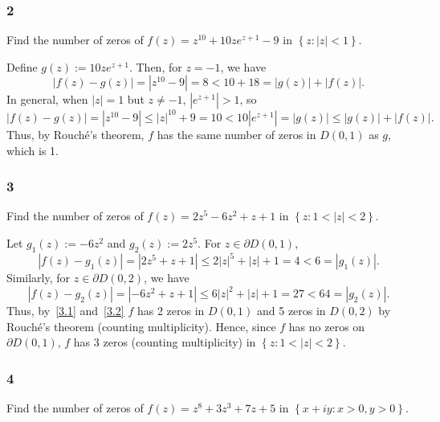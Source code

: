 \documentclass[12pt]{article}
\begin{document}
\newpage
\subsubsection*{2}
\begin{tcolorbox}
  Find the number of zeros of $f(z) = z^{10} + 10ze^{z + 1} - 9$ in $\left\{ z : |z| < 1 \right\}$.
\end{tcolorbox}
Define $g(z) := 10ze^{z+1}$. Then, for $z = -1$, we have
\[ |f(z) - g(z)| = |z^{10} - 9| = 8 < 10 + 18 = |g(z)| + |f(z)|. \]
In general, when $|z| = 1$ but $z \neq -1$, $|e^{z + 1}| > 1$, so
\[ |f(z) - g(z)| = |z^{10} - 9| \leq |z|^{10} + 9 = 10 < 10|e^{z+1}| = |g(z)| \leq |g(z)| + |f(z)|. \]
Thus, by Rouch\'{e}'s theorem, $f$ has the same number of zeros in $D(0,1)$ as $g$, which is 1.

\subsubsection*{3}
\begin{tcolorbox}
  Find the number of zeros of $f(z) = 2z^5 - 6z^2 + z + 1$ in $\left\{ z : 1 < |z| < 2 \right\}$.
\end{tcolorbox}
Let $g_1(z) := -6z^2$ and $g_2(z) := 2z^5$. For $z \in \partial D(0,1)$,
\begin{equation}
  |f(z) - g_1(z)| = |2z^5 + z + 1| \leq 2|z|^5 + |z| + 1 = 4 < 6 = |g_1(z)|.
  \label{3.1}
\end{equation}
Similarly, for $z \in \partial D(0,2)$, we have 
\begin{equation}
  |f(z) - g_2(z)| = |-6z^2 + z + 1| \leq 6|z|^2 + |z| + 1 = 27 < 64 = |g_2(z)|.
  \label{3.2}
\end{equation}
Thus, by~\eqref{3.1} and~\eqref{3.2} $f$ has 2 zeros in $D(0,1)$ and 5 zeros in $D(0,2)$ by Rouch\'{e}'s theorem (counting multiplicity). Hence, since
$f$ has no zeros on $\partial D(0,1)$, $f$ has 3 zeros (counting multiplicity) in $\left\{ z : 1 < |z| < 2 \right\}$.


\subsubsection*{4}
\begin{tcolorbox}
  Find the number of zeros of $f(z) = z^8 + 3z^3 + 7z + 5$ in $\left\{ x + iy : x > 0, y > 0 \right\}$.
\end{tcolorbox}
\end{document}
